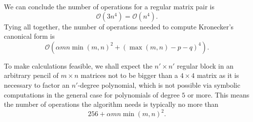 We can conclude the number of operations for a regular matrix pair is
\[
    \mathcal{O}(3n^4) = \mathcal{O}(n^4).
\]
Tying all together, the number of operations needed to compute Kronecker's canonical form is
\[
    \mathcal{O}(\alpha mn \min(m, n)^2 + (\max(m, n) - p - q)^4).
\]

\begin{remark}
    To make calculations feasible, we shall expect the \(n' \times n'\) regular block in an arbitrary pencil of
    \(m \times n\) matrices not to be bigger than a \(4 \times 4\) matrix as it is necessary to factor an
    \(n'\)-degree polynomial, which is not possible via symbolic computations in the general case for polynomials
    of degree \(5\) or more. This means the number of operations the algorithm needs is typically no more than
    \[
        256 + \alpha mn \min(m, n)^2.
    \]
\end{remark}

